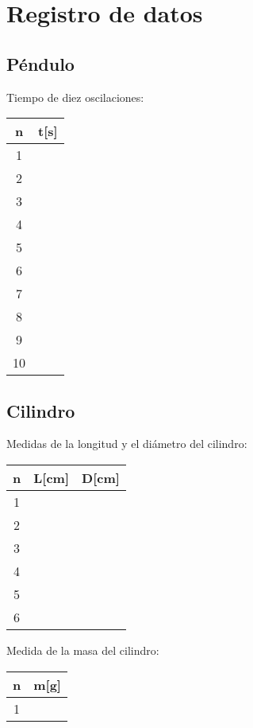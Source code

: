 \documentclass[letter,twoside,11pt]{article}
\begin{document}
\section{Registro de datos}
\subsection{Péndulo}
Tiempo de diez oscilaciones: \\
\begin{center}
\begin{tabular}{|c|>{\centering}m{3.0cm}<{\centering}|}
\hline
\textbf{n} & \textbf{t[s]} \tabularnewline \hline
1 & \\ \hline
2 & \\ \hline
3 & \\ \hline
4 & \\ \hline
5 & \\ \hline
6 & \\ \hline
7 & \\ \hline
8 & \\ \hline
9 & \\ \hline
10 & \\ \hline
\end{tabular}
\end{center}

\subsection{Cilindro}
Medidas de la longitud y el diámetro del cilindro:
\begin{center}
\begin{tabular}{|c|>{\centering}m{3.0cm}<{\centering}
                  |>{\centering}m{3.0cm}<{\centering}|}
\hline
\textbf{n} & \textbf{L[cm]} & \textbf{D[cm]} \tabularnewline \hline
1 & & \\ \hline
2 & & \\ \hline
3 & & \\ \hline
4 & & \\ \hline
5 & & \\ \hline
6 & & \\
\hline
\end{tabular}
\end{center}
\vspace{0.5cm}
Medida de la masa del cilindro:
\begin{center}
\begin{tabular}{|c|>{\centering}m{3.0cm}<{\centering}|}
\hline
\textbf{n} & \textbf{m[g]} \tabularnewline \hline
1 & \\
\hline
\end{tabular}
\end{center}
\end{document}
